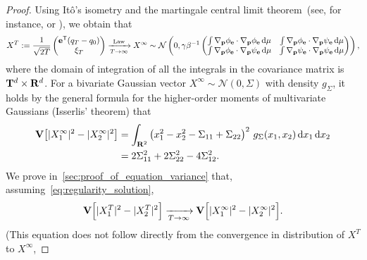 \documentclass[11pt,a4paper]{article}
\begin{document}
\begin{proof}
    Using It\^o's isometry and the martingale central limit theorem~(see, for instance, \cite{MR668684} or \cite[Theorem 3.3]{pavliotis2008multiscale}),
    we obtain that
    {\small%
        \[
            X^T :=
            \frac{1}{\sqrt{2T}}
            \begin{pmatrix}
                \boldsymbol{\mathbf e}^\mathsf T (q_T - q_0) \\
                \xi_T
            \end{pmatrix}
            \xrightarrow[T \to \infty]{\rm Law}
            X^{\infty} \sim
            \mathcal N \left(0,
                \gamma \beta^{-1}
                \begin{pmatrix}
                    \int \nabla_{\boldsymbol{\mathbf p}} \phi_{\boldsymbol{\mathbf e}} \cdot \nabla_{\boldsymbol{\mathbf p}} \phi_{\boldsymbol{\mathbf e}} \, \mathrm d \mu & \int \nabla_{\boldsymbol{\mathbf p}} \phi_{\boldsymbol{\mathbf e}} \cdot \nabla_{\boldsymbol{\mathbf p}} \psi_{\boldsymbol{\mathbf e}} \, \mathrm d \mu \\
                    \int \nabla_{\boldsymbol{\mathbf p}} \phi_{\boldsymbol{\mathbf e}} \cdot \nabla_{\boldsymbol{\mathbf p}} \psi_{\boldsymbol{\mathbf e}} \, \mathrm d \mu & \int \nabla_{\boldsymbol{\mathbf p}} \psi_{\boldsymbol{\mathbf e}} \cdot \nabla_{\boldsymbol{\mathbf p}} \psi_{\boldsymbol{\mathbf e}} \, \mathrm d \mu
                \end{pmatrix}
            \right),
        \]
    }
    where the domain of integration of all the integrals in the covariance matrix is $\mathbf T^d \times \mathbf R^d$.
    For a bivariate Gaussian vector $X^{\infty} \sim \mathcal N(0, \Sigma)$ with density $g_{\Sigma}$,
    it holds by the general formula for the higher-order moments of multivariate Gaussians (Isserlis' theorem)
    that
    \begin{align}
        \notag
        \mathbf{V} \bigl[ \lvert X^{\infty}_1 \rvert^2 - \lvert X^{\infty}_2 \rvert^2\bigr]
        &= \int_{\mathbf R^2} \left( x_1^2 - x_2^2 - \Sigma_{11} + \Sigma_{22} \right)^2 \, g_{\Sigma}(x_1, x_2) \, \mathrm d x_1 \, \mathrm d x_2 \\
        \label{eq:intermediate_identity}
        &= 2 \Sigma_{11}^2 + 2 \Sigma_{22}^2 - 4 \Sigma_{12}^2.
    \end{align}
    We prove in~\cref{sec:proof_of_equation_variance} that,
    assuming~\eqref{eq:regularity_solution},
    \begin{equation}
        \label{eq:limit_variance}
        \mathbf{V} \Bigl[ \lvert X^T_1 \rvert^2 - \lvert X^T_2 \rvert^2 \Bigr]
        \xrightarrow[T \to \infty]{}
        \mathbf{V} \Bigl[ \lvert X^{\infty}_1 \rvert^2 - \lvert X^{\infty}_2 \rvert^2 \Bigr].
    \end{equation}
    (This equation does not follow directly from the convergence in distribution of $X^T$ to $X^{\infty}$,

\end{proof}
\end{document}

